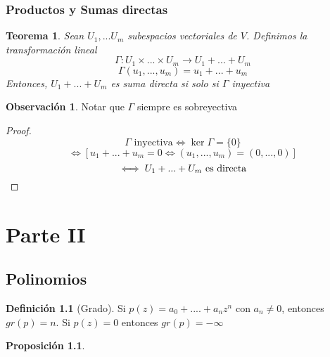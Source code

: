 \documentclass[11pt]{book}
\newtheorem{thm}{Teorema}[section]
\newtheorem{prop}[thm]{Proposición}
\theoremstyle{definition}
\newtheorem{defn}{Definición}[section]
\newtheorem{obs}{Observación}[section]
\begin{document}
\subsection{Productos y Sumas directas}
\begin{thm}
Sean $U_1,...U_m$ subespacios vectoriales de $V$. Definimos la transformación lineal
\[\Gamma:U_1\times...\times U_m\rightarrow U_1+...+U_m\]
\[\Gamma(u_1,...,u_m)=u_1+...+u_m\]
Entonces, $U_1+...+U_m$ es suma directa si solo si $\Gamma$ inyectiva
\end{thm}
\begin{obs}
Notar que $\Gamma$ siempre es sobreyectiva
\end{obs}
\begin{proof}
\[\Gamma\textrm{ inyectiva} \iff\ker\Gamma=\{0\}\]
\[\iff [u_1+...+u_m=0\iff(u_1,...,u_m)=(0,...,0)]\]
\[\iff U_1+...+U_m\textrm{ es directa}\qedhere\]
\end{proof}

\chapter{Parte II}
\section{Polinomios}
\begin{defn}[Grado]
Si $p(z)=a_0+....+a_nz^n$ con $a_n\neq 0$, entonces $gr(p)=n$. Si $p(z)=0$ entonces $gr(p)=-\infty$
\end{defn}
\begin{prop}

\end{prop}
\end{document}
